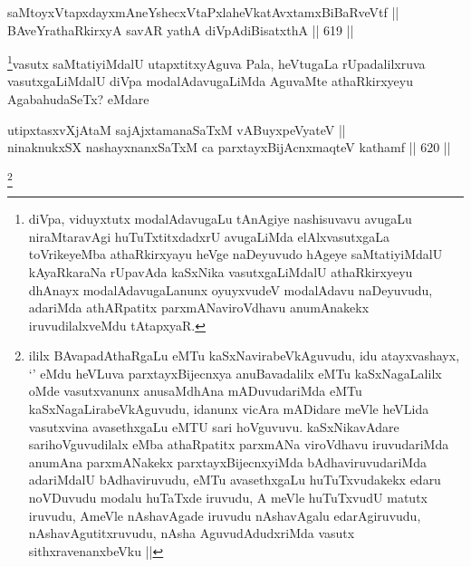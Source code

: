 
\begin{shl}
saMtoyxVtapxdayxmAneYshecxVtaPxlaheVkatAvxtamxBiBaRveVtf || \\
BAveYrathaRkirxyA savAR yathA diVpAdiBisatxthA ||  619 ||  
\end{shl}

\begin{artha}
\footnote{diVpa, viduyxtutx modalAdavugaLu tAnAgiye nashisuvavu avugaLu niraMtaravAgi huTuTxtitxdadxrU avugaLiMda elAlxvasutxgaLa toVrikeyeMba athaRkirxyayu heVge naDeyuvudo hAgeye saMtatiyiMdalU kAyaRkaraNa rUpavAda kaSxNika vasutxgaLiMdalU athaRkirxyeyu dhAnayx modalAdavugaLanunx oyuyxvudeV modalAdavu naDeyuvudu, adariMda athARpatitx parxmANaviroVdhavu anumAnakekx iruvudilalxveMdu tAtapxyaR.}vasutx saMtatiyiMdalU utapxtitxyAguva Pala, heVtugaLa rUpadalilxruva vasutxgaLiMdalU diVpa modalAdavugaLiMda AguvaMte athaRkirxyeyu AgabahudaSeTx? eMdare
\end{artha}


\begin{shl}
utipxtasxvXjAtaM sajAjxtamanaSaTxM vA\s BuyxpeVyateV || \\
ninaknukxSX nashayxnanxSaTxM ca parxtayxBijAcnxmaqteV kathamf ||  620 ||  
\end{shl}

\begin{artha}
\footnote{ililx BAvapadAthaRgaLu eMTu kaSxNavirabeVkAguvudu, idu atayxvashayx, `\stext' eMdu heVLuva parxtayxBijecnxya anuBavadalilx eMTu kaSxNagaLalilx oMde vasutxvanunx anusaMdhAna mADuvudariMda eMTu kaSxNagaLirabeVkAguvudu, idanunx vicAra mADidare meVle heVLida vasutxvina avasethxgaLu eMTU sari hoVguvuvu. kaSxNikavAdare sarihoVguvudilalx eMba athaRpatitx parxmANa viroVdhavu iruvudariMda anumAna parxmANakekx parxtayxBijecnxyiMda bAdhaviruvudariMda adariMdalU bAdhaviruvudu, eMTu avasethxgaLu huTuTxvudakekx edaru noVDuvudu modalu huTaTxde iruvudu, A meVle huTuTxvudU matutx iruvudu, AmeVle nAshavAgade iruvudu nAshavAgalu edarAgiruvudu, nAshavAgutitxruvudu, nAsha AguvudAdudxriMda vasutx sithxravenanxbeVku ||}
\end{artha}

	
